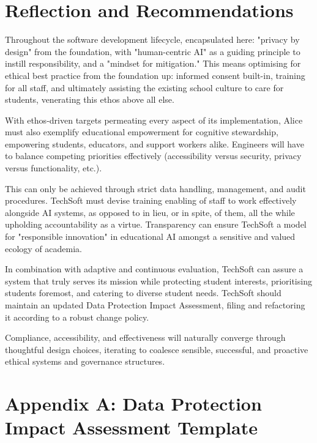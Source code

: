 \documentclass[14pt,a4paper]{article}
\begin{document}
\section{Reflection and Recommendations}
Throughout the software development lifecycle, encapsulated here: "privacy by design" from the foundation, with "human-centric AI" as a guiding principle to instill responsibility, and a "mindset for mitigation."
This means optimising for ethical best practice from the foundation up: informed consent built-in, training for all staff, and ultimately assisting the existing school culture to care for students, venerating this ethos above all else.

With ethos-driven targets permeating every aspect of its implementation, Alice must also exemplify educational empowerment for cognitive stewardship, empowering students, educators, and support workers alike. Engineers will have to balance competing priorities effectively (accessibility versus security, privacy versus functionality, etc.).

This can only be achieved through strict data handling, management, and audit procedures. TechSoft must devise training enabling of staff to work effectively alongside AI systems, as opposed to in lieu, or in spite, of them, all the while upholding accountability as a virtue.
Transparency can ensure TechSoft a model for "responsible innovation" in educational AI amongst a sensitive and valued ecology of academia.

In combination with adaptive and continuous evaluation, TechSoft can assure a system that truly serves its mission while protecting student interests, prioritising students foremost, and catering to diverse student needs.
TechSoft should maintain an updated Data Protection Impact Assessment, filing and refactoring it according to a robust change policy.

Compliance, accessibility, and effectiveness will naturally converge through thoughtful design choices, iterating to coalesce sensible, successful, and proactive ethical systems and governance structures.



\newpage
\appendix
\section{Appendix A: Data Protection Impact Assessment Template}\label{appendix:a}
\end{document}
